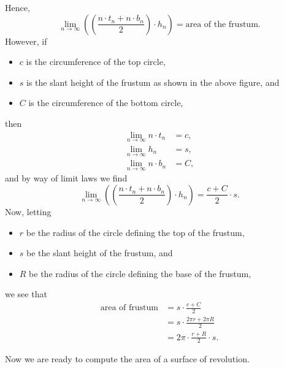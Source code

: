\documentclass{ximera}
\begin{document}
\begin{theorem}
\begin{explanation}
\begin{image}
    \end{image}
    Hence,
    \[
    \lim_{n\to \infty} \left(\left(\frac{n\cdot t_{n}+n\cdot b_n}{2}\right)\cdot h_n\right) = \text{area of the frustum.}
    \]
    However, if
    \begin{itemize}
    \item $c$ is the circumference of the top circle,
    \item $s$ is the slant height of the frustum as shown in the above
      figure, and 
    \item $C$ is the circumference of the bottom circle,    
    \end{itemize}
    then
    \begin{align*}
      \lim_{n\to \infty} n \cdot t_{n}  &  =c,\\
      \lim_{n\to \infty} h_{n}  &  =s,\\
      \lim_{n\to \infty} n\cdot b_{n}  &  =C,
    \end{align*}
    and by way of limit laws we find
    \[
    \lim_{n\to \infty} \left(\left(\frac{n\cdot t_{n}+n\cdot b_n}{2}\right)\cdot h_n\right) = \frac{c + C}{2}\cdot s.
    \]
    Now, letting
    \begin{itemize}
    \item $r$ be the radius of the circle defining the top of the frustum,
    \item $s$ be the slant height of the frustum, and
    \item $R$ be the radius of the circle defining the base of the frustum,
    \end{itemize}
    we see that
    \begin{align*}
      \text{area of frustum}  &= s\cdot \frac{c + C}{2} \\
      &= s\cdot \frac{2\pi r + 2\pi R}{2}\\
      &=2\pi \cdot \frac{r+R}{2}\cdot s.
    \end{align*}
  \end{explanation}
\end{theorem}
Now we are ready to compute the area of a surface of revolution.
\end{document}
